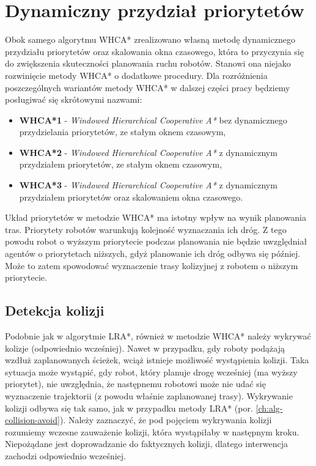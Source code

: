\section{Dynamiczny przydział priorytetów}
\label{ch:alg-priorities-allocation}
Obok samego algorytmu WHCA* zrealizowano własną metodę dynamicznego przydziału priorytetów oraz skalowania okna czasowego, która to przyczynia się do zwiększenia skuteczności planowania ruchu robotów. Stanowi ona niejako rozwinięcie metody WHCA* o dodatkowe procedury.
Dla rozróżnienia poszczególnych wariantów metody WHCA* w dalszej części pracy będziemy posługiwać się skrótowymi nazwami:
\begin{itemize}
	\item {\bf WHCA*1} - {\it Windowed Hierarchical Cooperative A*} bez dynamicznego przydzielania priorytetów, ze stałym oknem czasowym,
	\item {\bf WHCA*2} - {\it Windowed Hierarchical Cooperative A*} z dynamicznym przydziałem priorytetów, ze stałym oknem czasowym,
	\item {\bf WHCA*3} - {\it Windowed Hierarchical Cooperative A*} z dynamicznym przydziałem priorytetów oraz skalowaniem okna czasowego.
\end{itemize}

Układ priorytetów w metodzie WHCA* ma istotny wpływ na wynik planowania tras.
Priorytety robotów warunkują kolejność wyznaczania ich dróg.
Z tego powodu robot o wyższym priorytecie podczas planowania nie będzie uwzględniał agentów o priorytetach niższych, gdyż planowanie ich dróg odbywa się później.
Może to zatem spowodować wyznaczenie trasy kolizyjnej z robotem o niższym priorytecie.

\subsection{Detekcja kolizji}
Podobnie jak w algorytmie LRA*, również w metodzie WHCA* należy wykrywać kolizje (odpowiednio wcześniej).
Nawet w przypadku, gdy roboty podążają wzdłuż zaplanowanych ścieżek, wciąż istnieje możliwość wystąpienia kolizji.
Taka sytuacja może wystąpić, gdy robot, który planuje drogę wcześniej (ma wyższy priorytet), nie uwzględnia, że następnemu robotowi może nie udać się wyznaczenie trajektorii (z powodu właśnie zaplanowanej trasy).
Wykrywanie kolizji odbywa się tak samo, jak w przypadku metody LRA* (por. \ref{ch:alg-collision-avoid}).
Należy zaznaczyć, że pod pojęciem wykrywania kolizji rozumiemy wczesne zauważenie kolizji, która wystąpiłaby w następnym kroku. Niepożądane jest doprowadzanie do faktycznych kolizji, dlatego interwencja zachodzi odpowiednio wcześniej.

